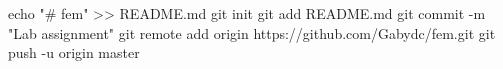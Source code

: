 echo "# fem" >> README.md
git init
git add README.md
git commit -m "Lab assignment"
git remote add origin https://github.com/Gabydc/fem.git
git push -u origin master
